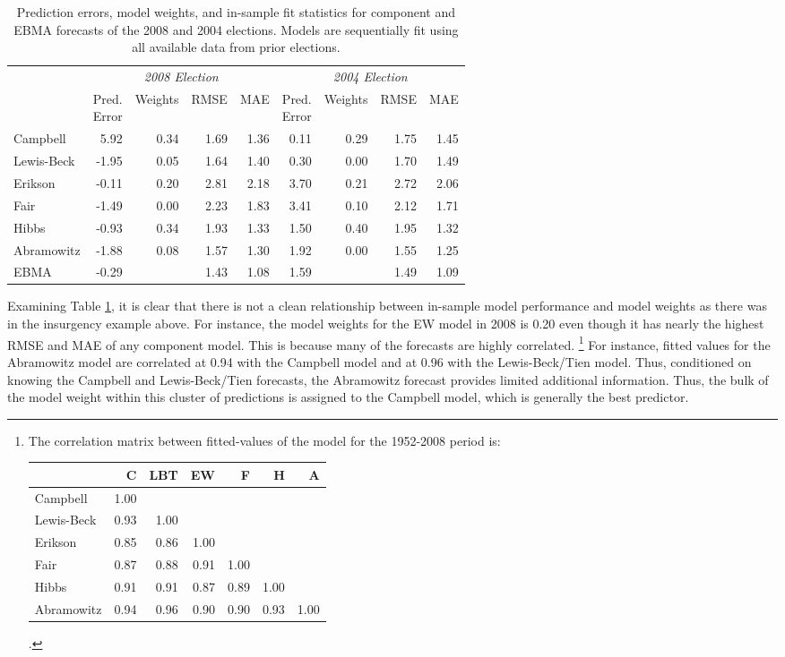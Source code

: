 \documentclass[pdftex,12pt,fullpage,oneside]{amsart}
\begin{document}
\begin{table}[ht!]
\caption{\footnotesize Prediction errors, model weights, and in-sample fit
  statistics for component and EBMA forecasts of the 2008 and 2004
  elections.  Models are sequentially fit using all available data
  from prior elections.}
\label{Pres-Year-Res}
\begin{tabular}{l | rrrr||rrrr}	
\toprule
 &\multicolumn{4}{c}{\textit{2008 Election}}  &\multicolumn{4}{c}{\textit{2004 Election}} \\ 
&\shortstack{Pred. \\ Error} &	Weights&	RMSE &MAE & \shortstack{Pred.\\  Error} &Weights&	RMSE&	MAE\\
\midrule
Campbell  &	5.92&	0.34	&1.69&	1.36	&	0.11&	0.29&1.75&	1.45\\
Lewis-Beck&	-1.95&	0.05	&1.64&	1.40	&	0.30	&0.00&	1.70	&1.49\\
Erikson&	-0.11&	0.20&	2.81& 	2.18	&	3.70	&0.21	&2.72&	2.06\\
Fair&	-1.49&	0.00	&2.23&	1.83	&	3.41&	0.10&	2.12& 1.71\\
Hibbs &	-0.93&	0.34	&1.93&	1.33	&	1.50&	0.40	&1.95	&1.32\\
Abramowitz&	-1.88&	0.08	&1.57&	1.30	&	1.92&	0.00	&1.55	&1.25\\
EBMA&	-0.29&	&1.43&	1.08	&	1.59	&	&1.49& 1.09\\
\bottomrule
\end{tabular}
\end{table}

Examining Table \ref{Pres-Year-Res}, it is clear that there is not a
clean relationship between in-sample model performance and model
weights as there was in the insurgency example above.  For instance,
the model weights for the EW model in 2008 is 0.20 even though it has
nearly the highest RMSE and MAE of any component model.  This is
because many of the forecasts are highly correlated.  \footnote{The
  correlation matrix between fitted-values of the model for the
  1952-2008 period is: \\
\begin{tabular}{l | rrrrrr}
  \toprule
 & C& LBT & EW& F & H & A \\ 
  \midrule
Campbell& 1.00 & & & & & \\ 
 Lewis-Beck& 0.93 & 1.00 & & & & \\ 
Erikson & 0.85 & 0.86 & 1.00 & & & \\ 
  Fair & 0.87 & 0.88 & 0.91 & 1.00 & & \\ 
Hibbs& 0.91 & 0.91 & 0.87 & 0.89 & 1.00 & \\ 
  Abramowitz & 0.94 & 0.96 & 0.90 & 0.90 & 0.93 & 1.00 \\ 
   \bottomrule
 \end{tabular}.}  For instance, fitted values for the Abramowitz model are correlated at
0.94 with the Campbell model and at 0.96 with the Lewis-Beck/Tien model.  Thus, conditioned on
knowing the Campbell and Lewis-Beck/Tien forecasts, the Abramowitz forecast provides limited
additional information.  Thus, the bulk of the model weight within
this cluster of predictions is assigned to the Campbell model, which is generally the best predictor.  
\end{document}
